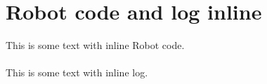 %
%
%
\chapter{Robot code and log inline}


This is some text with  inline Robot code.
\\
\\
This is some text with  inline log.
